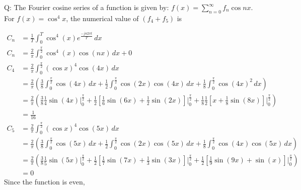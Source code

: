 \documentclass[journal,12pt,onecolumn]{IEEEtran}
\theoremstyle{remark}
\begin{document}
\let\vec\mathbf







\bigskip


Q: The Fourier cosine series of a function is given by: $f(x) = \sum_{n=0}^{\infty} f_{n}\cos{nx}$. For $f(x) = \cos^{4}x$, the numerical value of $(f_{4} + f_{5})$ is
 
\solution
\begin{table}[h]

\end{table}
\begin{align}
C_n &= \frac{1}{T} \int_{0}^{T} \cos^4(x) e^{\frac{-jn2\pi t}{T}} \,dx \\
    C_n &= \frac{2}{\pi} \int_{0}^{\frac{\pi}{2}} \cos^4(x) \cos(nx) \,dx + 0 \\
   C_4 &= \frac{2}{\pi} \int_{0}^{\frac{\pi}{2}} (\cos x)^4 \cos(4x) \, dx \\
&= \frac{2}{\pi} \left( \frac{3}{8} \int_{0}^{\frac{\pi}{2}} \cos(4x) \, dx + \frac{1}{2} \int_{0}^{\frac{\pi}{2}} \cos(2x) \cos(4x) \, dx + \frac{1}{8} \int_{0}^{\frac{\pi}{2}} \cos(4x)^2 \, dx \right) \\
&= \frac{2}{\pi} \left( \frac{3}{8} \frac{1}{4} \sin(4x) \Bigg|_{0}^{\frac{\pi}{2}} + \frac{1}{2} \left[\frac{1}{6} \sin(6x) + \frac{1}{2}\sin(2x) \right] \Bigg|_{0}^{\frac{\pi}{2}} + \frac{1}{8} \frac{1}{2} \left[ x + \frac{1}{8} \sin(8x) \right] \Bigg|_{0}^{\frac{\pi}{2}}  \right) \\
&=\frac{1}{16} \\
    C_5 &= \frac{2}{\pi} \int_{0}^{\frac{\pi}{2}} (\cos x)^4 \cos(5x) \, dx \\
&= \frac{2}{\pi} \left( \frac{3}{8} \int_{0}^{\frac{\pi}{2}} \cos(5x) \, dx + \frac{1}{2} \int_{0}^{\frac{\pi}{2}} \cos(2x) \cos(5x) \, dx + \frac{1}{8} \int_{0}^{\frac{\pi}{2}} \cos(4x) \cos(5x) \, dx \right) \\
&= \frac{2}{\pi} \left(\frac{3}{8} \frac{1}{5} \sin(5x) \Bigg|_{0}^{\frac{\pi}{2}} + \frac{1}{2} \left[ \frac{1}{7} \sin(7x) + \frac{1}{3} \sin(3x) \right] \Bigg|_{0}^{\frac{\pi}{2}} + \frac{1}{2} \left[ \frac{1}{9} \sin(9x) + \sin(x) \right] \Bigg|_{0}^{\frac{\pi}{2}} \right) \\
&= 0 
\end{align}
Since the function is even, 
\end{document}
